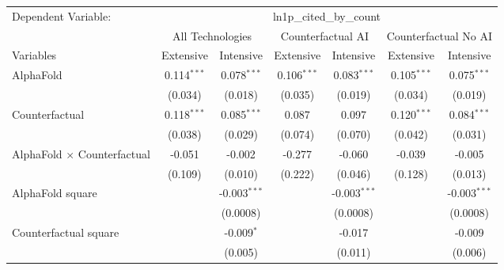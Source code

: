 \begingroup
\centering
\begin{tabular}{lcccccc}
   \tabularnewline \midrule \midrule
   Dependent Variable: & \multicolumn{6}{c}{ln1p\_cited\_by\_count}\\
 & \multicolumn{2}{c}{All Technologies} & \multicolumn{2}{c}{Counterfactual AI} & \multicolumn{2}{c}{Counterfactual No AI} \\
\cmidrule(lr){1-1}\cmidrule(lr){2-3} \cmidrule(lr){4-5} \cmidrule(lr){6-7}
Variables & \multicolumn{1}{c}{Extensive} & \multicolumn{1}{c}{Intensive} & \multicolumn{1}{c}{Extensive} & \multicolumn{1}{c}{Intensive} & \multicolumn{1}{c}{Extensive} & \multicolumn{1}{c}{Intensive} \\
\cmidrule(lr){1-1}\cmidrule(lr){2-2} \cmidrule(lr){3-3} \cmidrule(lr){4-4} \cmidrule(lr){5-5} \cmidrule(lr){6-6} \cmidrule(lr){7-7}
   AlphaFold                          & 0.114$^{***}$ & 0.078$^{***}$  & 0.106$^{***}$ & 0.083$^{***}$  & 0.105$^{***}$ & 0.075$^{***}$\\   
                                      & (0.034)       & (0.018)        & (0.035)       & (0.019)        & (0.034)       & (0.019)\\   
   Counterfactual                     & 0.118$^{***}$ & 0.085$^{***}$  & 0.087         & 0.097          & 0.120$^{***}$ & 0.084$^{***}$\\   
                                      & (0.038)       & (0.029)        & (0.074)       & (0.070)        & (0.042)       & (0.031)\\   
   AlphaFold $\times$ Counterfactual  & -0.051        & -0.002         & -0.277        & -0.060         & -0.039        & -0.005\\   
                                      & (0.109)       & (0.010)        & (0.222)       & (0.046)        & (0.128)       & (0.013)\\   
   AlphaFold square                   &               & -0.003$^{***}$ &               & -0.003$^{***}$ &               & -0.003$^{***}$\\   
                                      &               & (0.0008)       &               & (0.0008)       &               & (0.0008)\\   
   Counterfactual square              &               & -0.009$^{*}$   &               & -0.017         &               & -0.009\\   
                                      &               & (0.005)        &               & (0.011)        &               & (0.006)\\   

\end{tabular}
